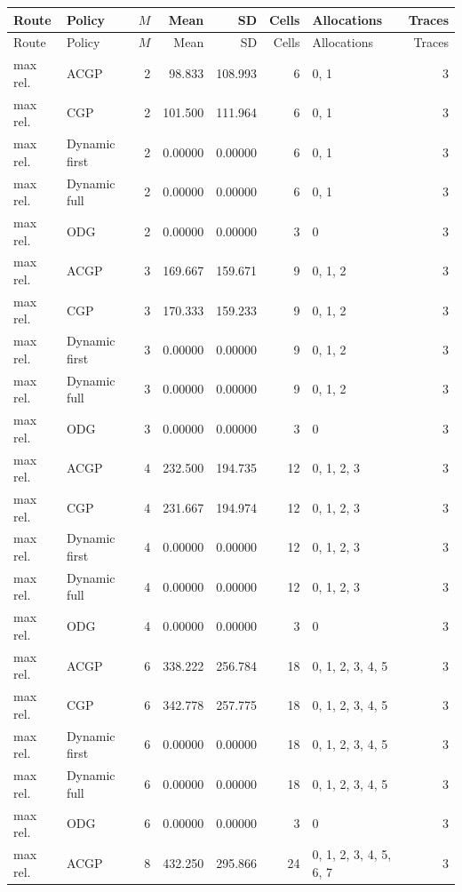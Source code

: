 \documentclass[10pt,a4paper]{article}
\begin{document}
\tiny\setlength{\tabcolsep}{2pt}\begin{longtable}{@{}p{23mm}p{29mm}rrrrp{36mm}r@{}}
\toprule Route & Policy & $M$ & Mean & SD & Cells & Allocations & Traces \\ \midrule\endfirsthead
\toprule Route & Policy & $M$ & Mean & SD & Cells & Allocations & Traces \\ \midrule\endhead
\bottomrule\endfoot
max rel. & ACGP & 2 & 98.833 & 108.993 & 6 & 0, 1 & 3 \\
max rel. & CGP & 2 & 101.500 & 111.964 & 6 & 0, 1 & 3 \\
max rel. & Dynamic first & 2 & 0.00000 & 0.00000 & 6 & 0, 1 & 3 \\
max rel. & Dynamic full & 2 & 0.00000 & 0.00000 & 6 & 0, 1 & 3 \\
max rel. & ODG & 2 & 0.00000 & 0.00000 & 3 & 0 & 3 \\
max rel. & ACGP & 3 & 169.667 & 159.671 & 9 & 0, 1, 2 & 3 \\
max rel. & CGP & 3 & 170.333 & 159.233 & 9 & 0, 1, 2 & 3 \\
max rel. & Dynamic first & 3 & 0.00000 & 0.00000 & 9 & 0, 1, 2 & 3 \\
max rel. & Dynamic full & 3 & 0.00000 & 0.00000 & 9 & 0, 1, 2 & 3 \\
max rel. & ODG & 3 & 0.00000 & 0.00000 & 3 & 0 & 3 \\
max rel. & ACGP & 4 & 232.500 & 194.735 & 12 & 0, 1, 2, 3 & 3 \\
max rel. & CGP & 4 & 231.667 & 194.974 & 12 & 0, 1, 2, 3 & 3 \\
max rel. & Dynamic first & 4 & 0.00000 & 0.00000 & 12 & 0, 1, 2, 3 & 3 \\
max rel. & Dynamic full & 4 & 0.00000 & 0.00000 & 12 & 0, 1, 2, 3 & 3 \\
max rel. & ODG & 4 & 0.00000 & 0.00000 & 3 & 0 & 3 \\
max rel. & ACGP & 6 & 338.222 & 256.784 & 18 & 0, 1, 2, 3, 4, 5 & 3 \\
max rel. & CGP & 6 & 342.778 & 257.775 & 18 & 0, 1, 2, 3, 4, 5 & 3 \\
max rel. & Dynamic first & 6 & 0.00000 & 0.00000 & 18 & 0, 1, 2, 3, 4, 5 & 3 \\
max rel. & Dynamic full & 6 & 0.00000 & 0.00000 & 18 & 0, 1, 2, 3, 4, 5 & 3 \\
max rel. & ODG & 6 & 0.00000 & 0.00000 & 3 & 0 & 3 \\
max rel. & ACGP & 8 & 432.250 & 295.866 & 24 & 0, 1, 2, 3, 4, 5, 6, 7 & 3 \\

\end{longtable}
\end{document}
